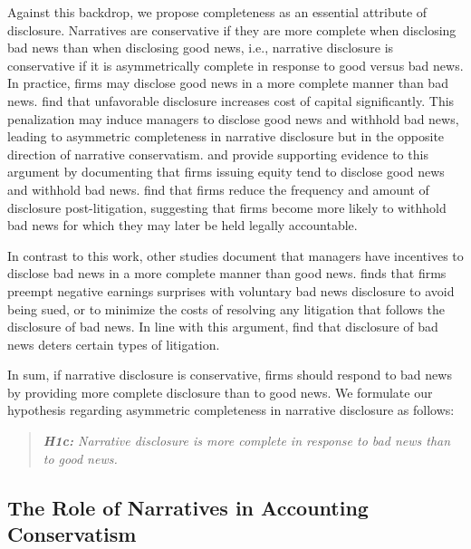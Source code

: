 \documentclass[letterpaper,12pt]{article}
\begin{document}
\begin{spacing}{1.5}
Against this backdrop, we propose completeness as an essential attribute of disclosure. Narratives are conservative if they are more complete when disclosing bad news than when disclosing good news, i.e., narrative disclosure is conservative if it is asymmetrically complete in response to good versus bad news. In practice, firms may disclose good news in a more complete manner than bad news.  find that unfavorable disclosure increases cost of capital significantly. This penalization may induce managers to disclose good news and withhold bad news, leading to asymmetric completeness in narrative disclosure but in the opposite direction of narrative conservatism.  and  provide supporting evidence to this argument by documenting that firms issuing equity tend to disclose good news and withhold bad news.  find that firms reduce the frequency and amount of disclosure post-litigation, suggesting that firms become more likely to withhold bad news for which they may later be held legally accountable. 

In contrast to this work, other studies document that managers have incentives to disclose bad news in a more complete manner than good news.  finds that firms preempt negative earnings surprises with voluntary bad news disclosure to avoid being sued, or to minimize the costs of resolving any litigation that follows the disclosure of bad news. In line with this argument,  find that disclosure of bad news deters certain types of litigation. 

In sum, if narrative disclosure is conservative, firms should respond to bad news by providing more complete disclosure than to good news. We formulate our hypothesis regarding asymmetric completeness in narrative disclosure as follows:

\begin{quote}\label{hyp:h1c}
\textit{\textbf{H1c:} Narrative disclosure is more complete in response to bad news than to good news.}
\end{quote}

\subsection{The Role of Narratives in Accounting Conservatism}\label{sec2.2}


\end{spacing}
\end{document}
